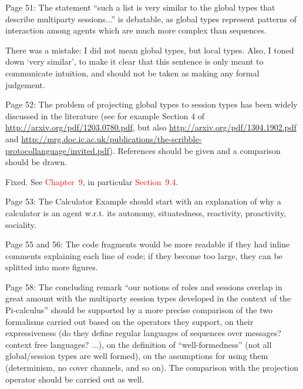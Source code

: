 \documentclass{article}
\newcommand*\R[1]{\textcolor{red}{#1}} %
\newcommand{\todo}[1]{[\textcolor{green}{TODO}: #1]}
\newenvironment{them}{\noindent\begingroup\color{blue}}{\endgroup\par}
\begin{document}
\begin{them}

Page 51:
The statement “such a list is very similar to the global types that describe
multiparty sessions...” is debatable, as global types represent patterns of
interaction among agents which are much more complex than sequences.

\end{them}

There was a mistake: I did not mean global types, but local types.
Also, I toned down `very similar',
  to make it clear that this sentence is only meant to communicate intuition,
and should not be taken as making any formal judgement.


\begin{them}

Page 52:
The problem of projecting global types to session types has been widely
discussed in the literature (see for example Section 4 of
\url{http://arxiv.org/pdf/1203.0780.pdf}, but also
\url{http://arxiv.org/pdf/1304.1902.pdf} and
\url{http://mrg.doc.ic.ac.uk/publications/the-scribble-protocollanguage/invited.pdf}).
References should be given and a comparison should be drawn.

\end{them}

Fixed.
See \R{Chapter~9},
  in particular \R{Section~9.4}.

\begin{them}

Page 53:
The Calculator Example should start with an explanation of why a calculator is
an agent w.r.t. its autonomy, situatedness, reactivity, proactivity, sociality.

\end{them}
\todo{}

\begin{them}

Page 55 and 56:
The code fragments would be more readable if they had inline comments
explaining each line of code; if they become too large, they can be splitted
into more figures.

\end{them}
\todo{}

\begin{them}

Page 58:
The concluding remark “our notions of roles and sessions overlap in great
amount with the multiparty session types developed in the context of the
Pi-calculus” should be supported by a more precise comparison of the two
formalisms carried out based on the operators they support, on their
expressiveness (do they define regular languages of sequences over messages?
context free languages? ...), on the definition of “well-formedness” (not all
global/session types are well formed), on the assumptions for using them
(determinism, no cover channels, and so on). The comparison with the projection
operator should be carried out as well.

\end{them}
\end{document}

